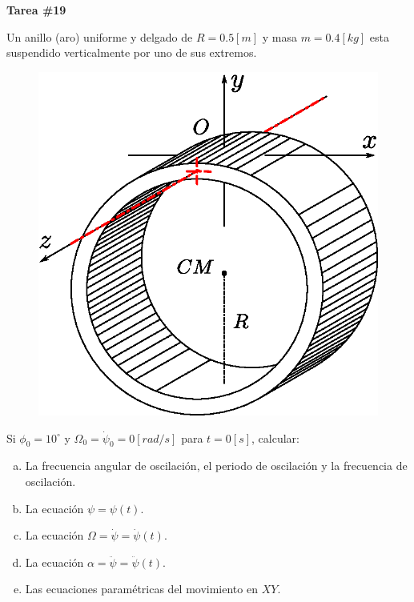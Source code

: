 \documentclass[letter,11pt]{article}
\begin{document}
\begin{center}
    {\Large \bf{Tarea \#19}}
\end{center}

Un anillo (aro) uniforme y delgado de $R = 0.5 [m]$ y masa $m = 0.4 [kg]$ esta
suspendido verticalmente por uno de sus extremos.

\begin{figure}[!h]
\centering
\includegraphics[scale=0.65]{resources/f1.eps}
\end{figure}

Si $\phi_0 = 10^\circ$ y $\Omega_0 = \dot{\psi}_0 = 0 [rad/s]$ para $t = 0 [s]$,
calcular:

\begin{enumerate}[a)]
    \item La frecuencia angular de oscilación, el periodo de oscilación y la
        frecuencia de oscilación.
    \item La ecuación $\psi = \psi(t)$.
    \item La ecuación $\Omega = \dot{\psi} = \dot{\psi}(t)$.
    \item La ecuación $\alpha = \ddot{\psi} = \ddot{\psi}(t)$.
    \item Las ecuaciones paramétricas del movimiento en $XY$.
\end{enumerate}
\end{document}
